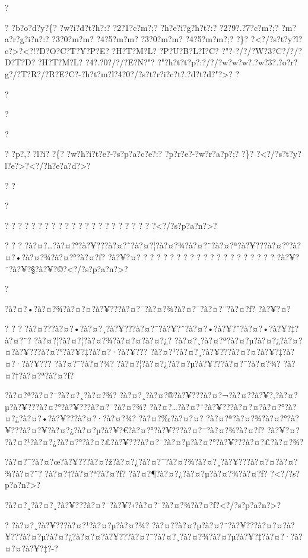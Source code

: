 \documentclass[11pt, openany]{book}
\begin{document}
{{{{{{{{{{{{{{?

? ?b?o?d?y?\{? ?w?i?d?t?h?:? ?2?1?c?m?;? ?h?e?i?g?h?t?:? ?2?9?.?7?c?m?;?
?m?a?r?g?i?n?:? ?3?0?m?m? ?4?5?m?m? ?3?0?m?m? ?4?5?m?m?;? ?\}?
?\textless{}?/?s?t?y?l?e?\textgreater{}?\textless{}?!?D?O?C?T?Y?P?E?
?H?T?M?L? ?P?U?B?L?I?C? ?"?-?/?/?W?3?C?/?/?D?T?D? ?H?T?M?L?
?4?.?0?/?/?E?N?"?
?"?h?t?t?p?:?/?/?w?w?w?.?w?3?.?o?r?g?/?T?R?/?R?E?C?-?h?t?m?l?4?0?/?s?t?r?i?c?t?.?d?t?d?"?\textgreater{}?
?

?

?

?

? ?p?,? ?l?i? ?\{? ?w?h?i?t?e?-?s?p?a?c?e?:? ?p?r?e?-?w?r?a?p?;? ?\}?
?\textless{}?/?s?t?y?l?e?\textgreater{}?\textless{}?/?h?e?a?d?\textgreater{}?

? ?

?

? ? ? ? ? ? ? ? ? ? ? ? ? ? ? ? ? ? ? ? ? ?
?\textless{}?/?s?p?a?n?\textgreater{}?

? ? ?
?à?¤?\ldots{}?à?¤?°?à?¥???à?¤?˜?à?¤?¦?à?¤?¾?à?¤?¨?à?¤?ª?à?¥???à?¤?°?à?¤?•?à?¤?¾?à?¤?°?à?¤?ƒ?
?à?¥?¤? ? ? ? ? ? ? ? ? ? ? ? ? ? ? ? ? ? ? ? ?
?à?¥?¨?à?¥?§?à?¥?©?\textless{}?/?s?p?a?n?\textgreater{}?

?

?à?¤?•?à?¤?¾?à?¤?¤?à?¥???à?¤?¯?à?¤?¾?à?¤?¯?à?¤?¨?à?¤?ƒ? ?à?¥?¤?

? ? ?
?à?¤???à?¤?•?à?¤?¸?à?¥???à?¤?¯?à?¥?ˆ?à?¤?•?à?¥?ˆ?à?¤?•?à?¥?‡?à?¤?¨?
?à?¤?¦?à?¤?¦?à?¤?¾?à?¤?¤?à?¤?¿?
?à?¤?¸?à?¤?ª?à?¤?µ?à?¤?¿?à?¤?¤?à?¥???à?¤?°?à?¥?‡?à?¤?·?à?¥???
?à?¤?¹?à?¤?¸?à?¥???à?¤?¤?à?¥?‡?à?¤?·?à?¥??? ?à?¤?¯?à?¤?¾?
?à?¤?¦?à?¤?¿?à?¤?µ?à?¥???à?¤?¯?à?¤?¾? ?à?¤?†?à?¤?ª?à?¤?ƒ?

?à?¤?ª?à?¤?¯?à?¤?¸?à?¤?¾?
?à?¤?¸?à?¤?®?à?¥???à?¤?¬?à?¤?­?à?¥?‚?à?¤?µ?à?¥???à?¤?°?à?¥???à?¤?¯?à?¤?¾?
?à?¤?\ldots{}?à?¤?¨?à?¥???à?¤?¤?à?¤?°?à?¤?¿?à?¤?•?à?¥???à?¤?·?à?¤?¾?
?à?¤?‰?à?¤?¤?
?à?¤?ª?à?¤?¾?à?¤?°?à?¥???à?¤?¥?à?¤?¿?à?¤?µ?à?¥?€?à?¤?°?à?¥???à?¤?¯?à?¤?¾?à?¤?ƒ?
?à?¥?¤?
?à?¤?¹?à?¤?¿?à?¤?°?à?¤?£?à?¥???à?¤?¯?à?¤?µ?à?¤?°?à?¥???à?¤?£?à?¤?¾?

?à?¤?¯?à?¤?œ?à?¥???à?¤?ž?à?¤?¿?à?¤?¯?à?¤?¾?à?¤?¸?à?¥???à?¤?¤?à?¤?¾?à?¤?¨?
?à?¤?†?à?¤?ª?à?¤?ƒ? ?à?¤?¶?à?¤?¿?à?¤?µ?à?¤?¾?à?¤?ƒ?
?\textless{}?/?s?p?a?n?\textgreater{}?

?à?¤?¸?à?¤?¸?à?¥???à?¤?¯?à?¥?‹?à?¤?¨?à?¤?¾?à?¤?ƒ?\textless{}?/?s?p?a?n?\textgreater{}?

? ?à?¤?¸?à?¥???à?¤?¹?à?¤?µ?à?¤?¾?
?à?¤?­?à?¤?µ?à?¤?¨?à?¥???à?¤?¤?à?¥???à?¤?µ?à?¤?¿?à?¤?¤?à?¥???à?¤?¯?à?¤?¸?à?¤?¾?à?¤?µ?à?¥?‡?à?¤?·?à?¤?¤?à?¥?‡?-?

}}}}}}}}}}}}}}
\end{document}

